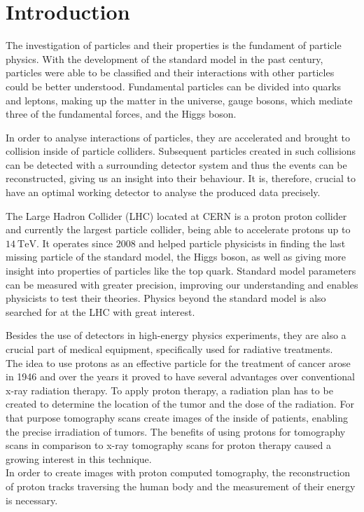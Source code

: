 \chapter{Introduction}
The investigation of particles and their properties is the fundament of particle physics. With the development of the standard model in the past century, particles were able to
be classified and their interactions with other particles could be better understood. Fundamental particles can be divided into quarks and leptons, making up the matter in the universe,
gauge bosons, which mediate three of the fundamental forces, and the Higgs boson.

In order to analyse interactions of particles, they are accelerated and brought to collision inside of particle colliders. Subsequent particles created in such collisions
can be detected with a surrounding detector system and thus the events can be reconstructed, giving us an insight into their behaviour. It is, therefore, crucial to have
an optimal working detector to analyse the produced data precisely.

The Large Hadron Collider (LHC) located at CERN is a proton proton collider and currently the largest particle collider, being able to accelerate protons up to $\SI{14}{\tera\eV}$.
It operates since 2008 and helped particle physicists in finding the last missing particle of the standard model, the Higgs boson, as well as giving more insight
into properties of particles like the top quark. Standard model parameters can be measured with greater precision, improving our understanding and enables physicists to
test their theories. Physics beyond the standard model is also searched for at the LHC with great interest.

Besides the use of detectors in high-energy physics experiments, they are also a crucial part of medical equipment, specifically used for radiative treatments. \\
The idea to use protons as an effective particle for the treatment of cancer arose in 1946 and over the years it proved to have several advantages over
conventional x-ray radiation therapy. To apply proton therapy, a radiation plan has to be created to determine the location of the tumor and the dose of the radiation.
For that purpose tomography scans create images of the inside of patients, enabling the precise irradiation of tumors.
The benefits of using protons for tomography scans in comparison to x-ray tomography scans for proton therapy caused a growing interest in this technique. \\
In order to create images with proton computed tomography, the reconstruction of proton tracks traversing the human body and the measurement of their energy is necessary.

